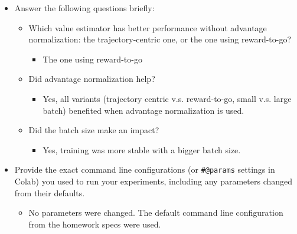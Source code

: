 \documentclass{article}
\begin{document}
\begin{itemize}
\item Answer the following questions briefly: 
\begin{itemize}
\item Which value estimator has better performance without advantage normalization: the trajectory-centric one, or the one using reward-to-go?
\begin{itemize}
    \item The one using reward-to-go
\end{itemize}
\item Did advantage normalization help?
\begin{itemize}
    \item Yes, all variants (trajectory centric v.s. reward-to-go, small v.s. large batch) benefited when advantage normalization is used.
\end{itemize}
\item Did the batch size make an impact?
\begin{itemize}
    \item Yes, training was more stable with a bigger batch size.
\end{itemize}
\end{itemize}
\item Provide the exact command line configurations (or \texttt{\#@params} settings in Colab) you used to run your experiments, including any parameters changed from their defaults.
\begin{itemize}
    \item No parameters were changed. The default command line configuration from the homework specs were used.
\end{itemize}
\end{itemize}
\end{document}
